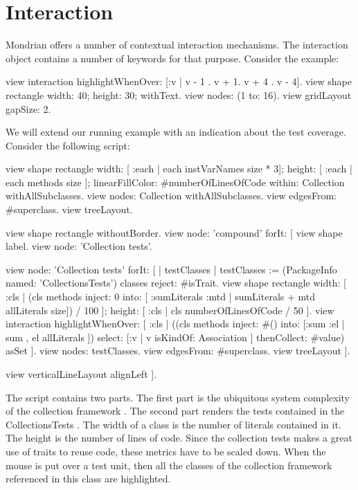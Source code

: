 \documentclass[a4paper,10pt,twoside]{book}
\begin{document}
\section{Interaction}
Mondrian offers a number of contextual interaction mechanisms. The interaction object contains a number of keywords for that purpose. Consider the example:

\begin{code}{}
view interaction 
  highlightWhenOver: [:v | {v - 1 . v + 1. v + 4 . v - 4}].
view shape rectangle 
  width: 40;
  height: 30;
  withText.
view nodes: (1 to: 16).
view gridLayout gapSize: 2.
\end{code}

We will extend our running example with an indication about the test coverage. Consider the following script:

\begin{code}{}
view shape rectangle
  width: [ :each | each instVarNames size * 3];
  height: [ :each | each methods size ];
  linearFillColor: #numberOfLinesOfCode within: Collection withAllSubclasses.
view nodes: Collection withAllSubclasses.
view edgesFrom: #superclass.
view treeLayout.

view shape rectangle withoutBorder.
view node: 'compound' forIt: [
  view shape label.
  view node: 'Collection tests'.
  
  view node: 'Collection tests' forIt: [
    | testClasses |
    testClasses := (PackageInfo named: 'CollectionsTests') classes reject: #isTrait.
    view shape rectangle
      width: [ :cls | (cls methods inject: 0 into: [ :sumLiterals :mtd | sumLiterals + mtd allLiterals size]) / 100 ];
      height: [ :cls | cls numberOfLinesOfCode / 50 ].
    view interaction 
        highlightWhenOver: [ :cls | ((cls methods inject: #() 
                        into: [:sum :el | sum , el allLiterals ]) select: [:v | v isKindOf: Association ] thenCollect: #value) asSet ].
    view nodes: testClasses.
    view edgesFrom: #superclass.
    view treeLayout ].
  
  view verticalLineLayout alignLeft
].
\end{code}

The script contains two parts. The first part is the ubiquitous system complexity of the collection framework .  The second part renders the tests contained in the CollectionsTests . The width of a class is the number of literals contained in it. The height is the number of lines of code. Since the collection tests makes a great use of traits to reuse code, these metrics have to be scaled down. When the mouse is put over a test unit, then all the classes of the collection framework referenced in this class are highlighted. 
\end{document}
